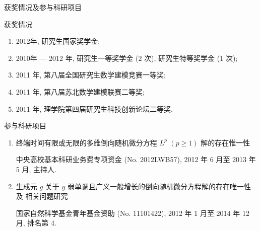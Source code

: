 \documentclass[xcolor=svgnames,serif,table,10pt]{beamer}
\begin{document}
\begin{frame}[t]{获奖情况及参与科研项目}
\sffamily

\begin{block}{{\normalfont 获奖情况}}
  \begin{enumerate}\footnotesize
    \item 2012年, 研究生国家奖学金;
    \item 2010年 --- 2012 年, 研究生一等奖学金 (2 次), 研究生特等奖学金 (1 次);
    \item 2011 年, 第八届全国研究生数学建模竞赛一等奖;
    \item 2011 年, 第八届苏北数学建模联赛二等奖;
    \item 2011 年, 理学院第四届研究生科技创新论坛二等奖.
  \end{enumerate}
\end{block}
\pause
\begin{block}{{\normalfont 参与科研项目}}
  \begin{enumerate}\footnotesize
    \item 终端时间有限或无限的多维倒向随机微分方程 $L^p$ $(p\geq 1)$ 解的存在惟一性

          {\normalfont 中央高校基本科研业务费专项资金} (No. 2012LWB57), 2012 年 6 月至 2013 年 5 月, 主持人.
    \item 生成元 $g$ 关于 $y$ 弱单调且广义一般增长的倒向随机微分方程解的存在唯一性及
          相关问题研究

          {\normalfont 国家自然科学基金青年基金资助} (No. 11101422),
          2012 年 1 月至 2014 年 12 月, 排名第 4.
  \end{enumerate}
\end{block}
\end{frame}
\end{document}
